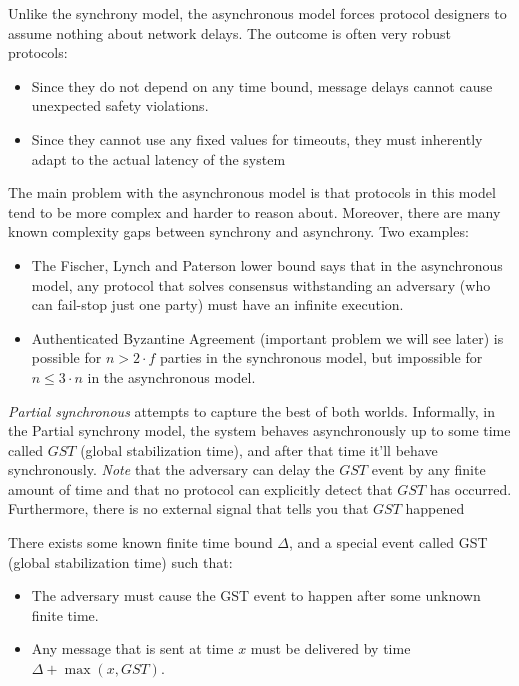 Unlike the synchrony model, 
the asynchronous model forces protocol designers to assume nothing about network delays.
The outcome is often very robust protocols:

\begin{itemize}
    \item Since they do not depend on any time bound, message delays 
    cannot cause unexpected safety violations.
    \item Since they cannot use any fixed values for timeouts, 
    they must inherently adapt to the actual latency of the system
\end{itemize}

The main problem with the asynchronous model is that protocols in this model tend to be more
complex and harder to reason about. 
Moreover, there are many known complexity gaps between synchrony and asynchrony. Two examples:

\begin{itemize}
    \item The Fischer, Lynch and Paterson \cite[FLP, 1985]{flp} lower bound says 
    that in the asynchronous model, any protocol that solves consensus 
    withstanding an adversary (who can fail-stop just one party) must have an infinite execution.
    \item Authenticated Byzantine Agreement (important problem we will see later) is possible for 
    $n>2\cdot f$ parties in the synchronous model, but impossible for $n \le3\cdot n$ in the asynchronous model.
\end{itemize}




\emph{Partial synchronous} attempts to capture the best of both worlds.
Informally, in the Partial synchrony model, the system behaves asynchronously 
up to some time called $GST$ (global stabilization time), and after that time it'll behave synchronously.
\emph{Note} that the adversary can delay the $GST$ event by any finite amount
of time and that no protocol can explicitly detect that $GST$ has occurred.
Furthermore, there is no external signal that tells you that $GST$ happened

\begin{defn}
    There exists some known finite time bound $\Delta$,
    and a special event called GST (global stabilization time) such that:
    \begin{itemize}
        \item The adversary must cause the GST event to happen after 
        some unknown finite time.
        \item Any message that is sent at time $x$ must be delivered by 
        time $\Delta+\max\left(x,GST\right)$.
    \end{itemize}
\end{defn}

